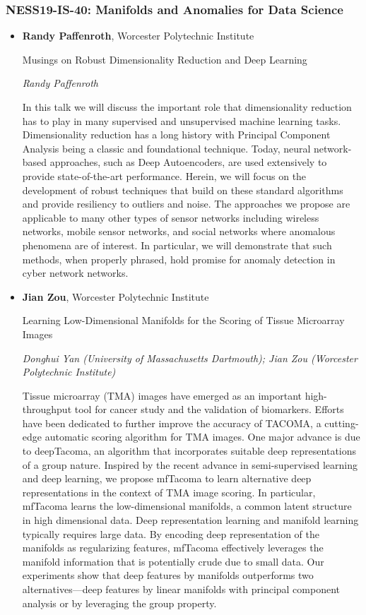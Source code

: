 \subsubsection*{NESS19-IS-40: Manifolds and Anomalies for Data Science}

\begin{itemize}
\item \textbf{Randy Paffenroth}, Worcester Polytechnic Institute

Musings on Robust Dimensionality Reduction and Deep Learning

\emph{\footnotesize Randy Paffenroth}

In this talk we will discuss the important role that dimensionality reduction has to play in many supervised and unsupervised machine learning tasks.  Dimensionality reduction has a long history with Principal Component Analysis being a classic and foundational technique.   Today, neural network-based approaches, such as Deep Autoencoders, are used extensively to provide state-of-the-art performance.   Herein, we will focus on the development of robust techniques that build on these standard algorithms and provide resiliency to outliers and noise.  The approaches we propose are applicable to many other types of sensor networks including wireless networks, mobile sensor networks, and social networks where anomalous phenomena are of interest.  In particular, we will demonstrate that such methods, when properly phrased, hold promise for anomaly detection in cyber network networks.

\item \textbf{Jian Zou}, Worcester Polytechnic Institute

Learning Low-Dimensional Manifolds for the Scoring of Tissue Microarray Images

\emph{\footnotesize Donghui Yan (University of Massachusetts Dartmouth); Jian Zou (Worcester Polytechnic Institute)}

Tissue microarray (TMA) images have emerged as an important high-throughput tool for cancer study and the validation of biomarkers. Efforts have been dedicated to further improve the accuracy of TACOMA, a cutting-edge automatic scoring algorithm for TMA images. One major advance is due to deepTacoma, an algorithm that incorporates suitable deep representations of a group nature. Inspired by the recent advance in semi-supervised learning and deep learning, we propose mfTacoma to learn alternative deep representations in the context of TMA image scoring. In particular, mfTacoma learns the low-dimensional manifolds, a common latent structure in high dimensional data. Deep representation learning and manifold learning typically requires large data. By encoding deep representation of the manifolds as regularizing features, mfTacoma effectively leverages the manifold information that is potentially crude due to small data. Our experiments show that deep features by manifolds outperforms two alternatives---deep features by linear manifolds with principal component analysis or by leveraging the group property.


\end{itemize}
